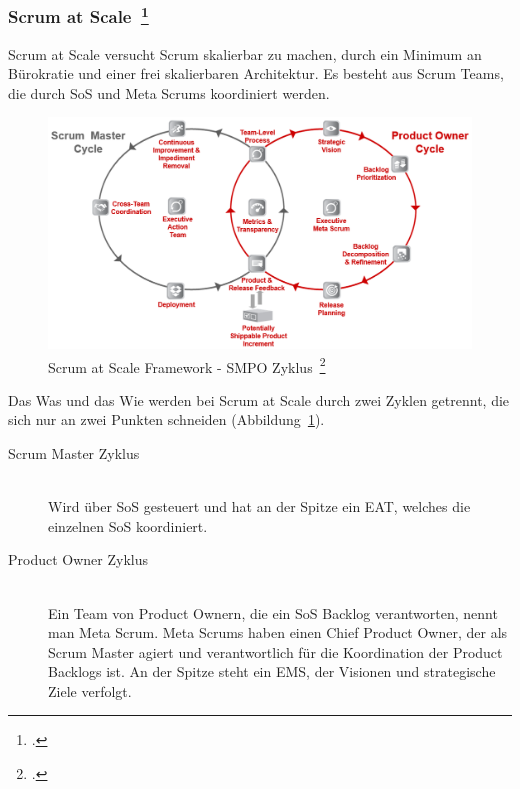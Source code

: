 \clearpage
\subsubsection[Scrum at Scale]{Scrum at Scale~\footcite[vgl.][]{scale}}

Scrum at Scale versucht Scrum skalierbar zu machen, durch ein Minimum an Bürokratie und einer frei skalierbaren Architektur.
Es besteht aus Scrum Teams, die durch \ac{SoS} und Meta Scrums koordiniert werden. 
\begin{savenotes}
  \begin{figure}[H] 
    \centering
       \includegraphics[width=1.0\textwidth]{img/scrumatscale.png}
    \caption[Scrum at Scale Framework {-} SMPO Zyklus]{Scrum at Scale Framework {-} SMPO Zyklus~\footcite{scrumatscale_framework}}\label{fig:sas}
  \end{figure}
\end{savenotes}

Das Was und das Wie werden bei Scrum at Scale durch zwei Zyklen getrennt, die sich nur an zwei Punkten schneiden (Abbildung~\ref{fig:sas}).
\begin{description}
  \item[Scrum Master Zyklus] \hfill \\ Wird über \ac{SoS} gesteuert und hat an der Spitze ein \ac{EAT}, welches die einzelnen \ac{SoS} koordiniert.
  \item[Product Owner Zyklus] \hfill \\ Ein Team von Product Ownern, die ein \ac{SoS} Backlog verantworten, nennt man Meta Scrum. Meta Scrums haben einen Chief Product Owner, der als Scrum Master agiert und verantwortlich für die Koordination der Product Backlogs ist. An der Spitze steht ein \ac{EMS}, der Visionen und strategische Ziele verfolgt.
\end{description}

